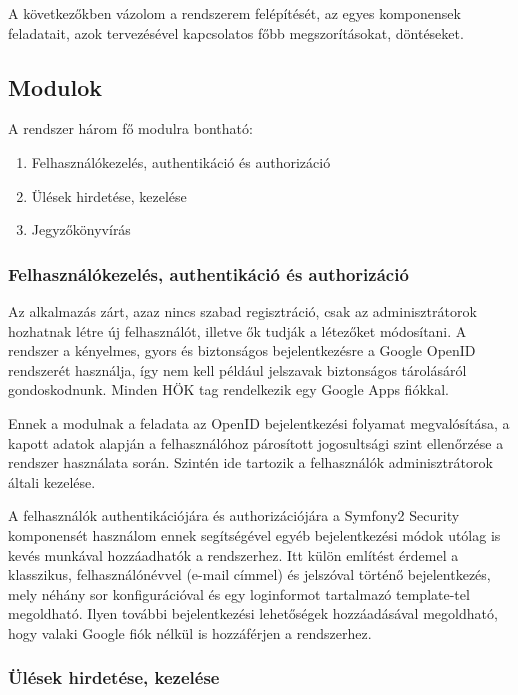 \documentclass[a4paper,12pt,oneside]{report}
\begin{document}
A következőkben vázolom a rendszerem felépítését, az egyes komponensek feladatait, azok tervezésével kapcsolatos főbb megszorításokat, döntéseket.

\subsection{Modulok}

A rendszer három fő modulra bontható:

\begin{enumerate}
    \item Felhasználókezelés, authentikáció és authorizáció
    \item Ülések hirdetése, kezelése
    \item Jegyzőkönyvírás
\end{enumerate}

\subsubsection{Felhasználókezelés, authentikáció és authorizáció}

Az alkalmazás zárt, azaz nincs szabad regisztráció, csak az adminisztrátorok hozhatnak létre új felhasználót, illetve ők tudják a létezőket módosítani. A rendszer a kényelmes, gyors és biztonságos bejelentkezésre a Google OpenID rendszerét használja, így nem kell például jelszavak biztonságos tárolásáról gondoskodnunk. Minden HÖK tag rendelkezik egy Google Apps fiókkal.

Ennek a modulnak a feladata az OpenID bejelentkezési folyamat megvalósítása, a kapott adatok alapján a felhasználóhoz párosított jogosultsági szint ellenőrzése a rendszer használata során. Szintén ide tartozik a felhasználók adminisztrátorok általi kezelése.

A felhasználók authentikációjára és authorizációjára a Symfony2 Security komponensét használom \textendash{} ennek segítségével egyéb bejelentkezési módok utólag is kevés munkával hozzáadhatók a rendszerhez. Itt külön említést érdemel a klasszikus, felhasználónévvel (e-mail címmel) és jelszóval történő bejelentkezés, mely néhány sor konfigurációval és egy loginformot tartalmazó template-tel megoldható. Ilyen további bejelentkezési lehetőségek hozzáadásával megoldható, hogy valaki Google fiók nélkül is hozzáférjen a rendszerhez.

\subsubsection{Ülések hirdetése, kezelése}
\end{document}
